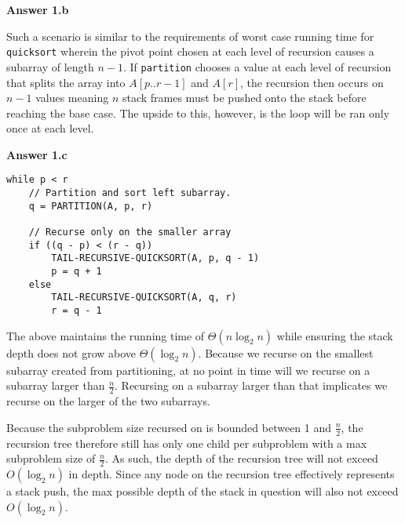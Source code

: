 \documentclass{article}
\begin{document}
\textbf{Answer 1.b}

Such a scenario is similar to the requirements of worst case running time for 
\texttt{quicksort} wherein the pivot point chosen at each level of recursion 
causes a subarray of length $n-1$. If \texttt{partition} chooses a value at each 
level of recursion that splits the array into $A[p..r-1]$ and $A[r]$, the 
recursion then occurs on $n-1$ values meaning $n$ stack frames must be pushed 
onto the stack before reaching the base case. The upside to this, however, is the
loop will be ran only once at each level. 

\textbf{Answer 1.c}

\begin{verbatim}
while p < r
    // Partition and sort left subarray.
    q = PARTITION(A, p, r)

    // Recurse only on the smaller array
    if ((q - p) < (r - q))
        TAIL-RECURSIVE-QUICKSORT(A, p, q - 1)
        p = q + 1    
    else
        TAIL-RECURSIVE-QUICKSORT(A, q, r)
        r = q - 1
\end{verbatim}

The above maintains the running time of $\Theta(n \log_{2} n)$ while ensuring the
stack depth does not grow above $\Theta(\log_{2}n)$. Because we recurse on the 
smallest subarray created from partitioning, at no point in time will we recurse
on a subarray larger than $\frac{n}{2}$. Recursing on a subarray larger than that
implicates we recurse on the larger of the two subarrays. 

Because the subproblem size recursed on is bounded between 1 and $\frac{n}{2}$, 
the recursion tree therefore still has only one child per subproblem with a max
subproblem size of $\frac{n}{2}$. As such, the depth of the recursion tree will 
not exceed $O(\log_{2}n)$ in depth. Since any node on the recursion tree 
effectively represents a stack push, the max possible depth of the stack in 
question will also not exceed $O(\log_{2}n)$. 

\newpage

\end{document}
